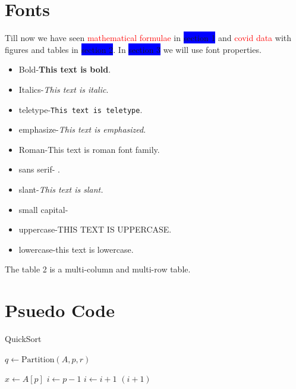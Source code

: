 \documentclass{article}
\begin{document}
\section{Fonts}
Till now we have seen \textcolor{red}{mathematical formulae} in \colorbox{blue}{section 1} and \textcolor{red}{covid data} with figures and tables in \colorbox{blue}{section 2}. 
In \colorbox{blue}{section 3} we will use font properties. \begin{itemize}
\item Bold-\textbf{This text is bold}. 
\item Italics-\textit{This text is italic}. 
\item teletype-\texttt{This text is teletype}. 
\item emphasize-\emph{This text is emphasized}. 
\item Roman-\rm {This text is roman font family}. 
\item sans serif- .
\item slant-\sl{This text is slant}. 
\item small capital- 
\item uppercase-THIS TEXT IS UPPERCASE. 
\item lowercase-this text is lowercase.
\end{itemize}
 The table 2 is a multi-column and multi-row table.

\newpage
\pagecolor{white}
\section{Psuedo Code}
\begin{algorithm}
\caption{QuickSort}
\begin{algorithmic}[1]
        \State $q \gets \text{Partition}(A, p, r)$
        \State {}
        \State {}
    \EndIf
\EndFunction

    \State $x \gets A[p]$
    \State $i \gets p - 1$
            \State $i \gets i + 1$
            \State {}
        \EndIf
    \EndFor
    \State {}
    \State \Return $(i + 1)$
\EndFunction
\end{algorithmic}
\end{algorithm}
\end{document}
